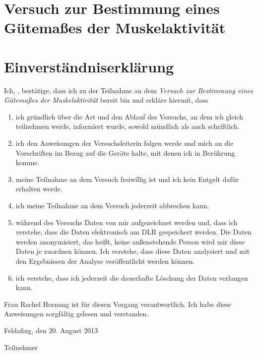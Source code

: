 \documentclass{article}
\begin{document}
\section*{Versuch zur Bestimmung eines Gütema\ss es der Muskelaktivität}
\vspace{1cm}

\section*{Einverständniserklärung}

Ich, \underline{\hspace{4cm}}, bestätige, dass ich zu der Teilnahme an dem \emph{Versuch zur Bestimmung eines G\"utema\ss es der Muskelaktivität} bereit bin und erkläre hiermit, dass
\begin{enumerate}
\item ich gr\"undlich \"uber die Art und den Ablauf des Versuchs, an dem ich gleich teilnehmen werde, informiert wurde, sowohl m\"undlich als auch schriftlich.
\item ich den Anweisungen der Versuchsleiterin folgen werde und mich an die Vorschriften im Bezug auf die Geräte halte, mit denen ich in Ber\"uhrung komme.
\item meine Teilnahme an dem Versuch freiwillig ist und ich kein Entgelt daf\"ur erhalten werde.
\item ich meine Teilnahme an dem Versuch jederzeit abbrechen kann.
\item während des Versuchs Daten von mir aufgezeichnet werden und, dass ich verstehe, dass die Daten elektronisch am DLR gespeichert werden. Die Daten werden anonymisiert, das hei\ss t, keine au\ss enstehende Person wird mir diese Daten je zuordnen können. Ich verstehe, dass diese Daten analysiert und mit den Ergebnissen der Analyse veröffentlicht werden können.
\item ich verstehe, dass ich jederzeit die dauerhafte Löschung der Daten verlangen kann.
\end{enumerate}
Frau Rachel Hornung ist f\"ur diesen Vorgang verantwortlich.
Ich habe diese Anweisungen sorgfältig gelesen und verstanden.

\vspace{1cm}

Feldafing, den 20. August 2013

\vspace{2cm}
\underline{\hspace{4cm}}

Teilnehmer
\end{document}
